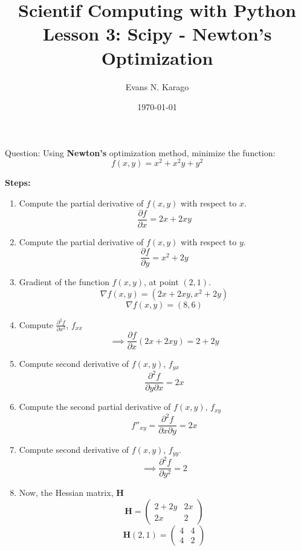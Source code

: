 \documentclass[11pt]{article}
\title{Scientif Computing with Python \\ \Large Lesson 3: Scipy - Newton's Optimization}
\date{\today}
\author{Evans N. Karago}
\begin{document}
\maketitle	
Question: Using \textbf{Newton's} optimization method, minimize the function:
\[
f(x, y) = x^2 + x^2y + y^2
\]

\textbf{Steps:}
\begin{enumerate}
\item Compute the partial derivative of $f(x, y)$ with respect to $x$.
\[
\frac{\partial f}{\partial x}  = 2x + 2xy
\]

\item Compute the partial derivative of $f(x, y)$ with respect to $y$.
\[
\frac{\partial f}{\partial y} = x^2 + 2y
\]

\item Gradient of the function $f(x, y)$, at point  $(2, 1)$.
\[
\nabla f(x, y) = (2x+2xy, x^2 + 2y)
\]
\[
\nabla f(x, y) = (8, 6)
\]

\item Compute $\frac{\partial^2 f}{\partial x^2}$, $f_{xx}$
\[
\implies \frac{\partial f}{\partial x}(2x + 2xy) = 2 + 2y
\]

\item Compute second derivative of $f(x, y)$, $f_{yx}$
\[
\frac{\partial^2 f}{\partial y \partial x} = 2x
\]

\item Compute the second partial derivative of $f(x, y)$, $f_{xy}$ 
\[
f''_{xy}  = \frac{\partial^2 f}{\partial x \partial y} = 2x
\]

\item Compute second derivative of $f(x, y)$, $f_{yy}$.
\[
\implies \frac{\partial^2 f}{\partial y^2} = 2
\]

\item Now, the Hessian matrix, $\mathbf{H}$
\[
\mathbf{H} = 
\begin{pmatrix}
2 + 2y & 2x \\
2x & 2
\end{pmatrix}
\]
\[
\mathbf{H}(2, 1)  = \begin{pmatrix}
4 & 4 \\
4 & 2
\end{pmatrix}
\]


\end{enumerate}
\end{document}
